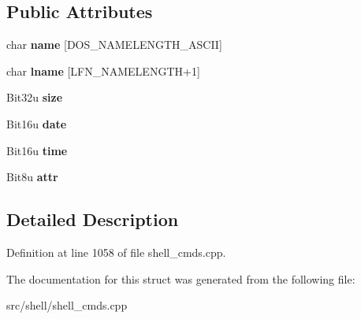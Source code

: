 \subsection*{Public Attributes}
\begin{DoxyCompactItemize}
\item 
\hypertarget{structDtaResult_a35acc0819ed5d484ae67b0a150702e65}{char {\bfseries name} \mbox{[}D\-O\-S\-\_\-\-N\-A\-M\-E\-L\-E\-N\-G\-T\-H\-\_\-\-A\-S\-C\-I\-I\mbox{]}}\label{structDtaResult_a35acc0819ed5d484ae67b0a150702e65}

\item 
\hypertarget{structDtaResult_a14bec00dd51574d0ce7ed702fcafe720}{char {\bfseries lname} \mbox{[}L\-F\-N\-\_\-\-N\-A\-M\-E\-L\-E\-N\-G\-T\-H+1\mbox{]}}\label{structDtaResult_a14bec00dd51574d0ce7ed702fcafe720}

\item 
\hypertarget{structDtaResult_ae204e54f6811d77f19876e6b7856ca58}{Bit32u {\bfseries size}}\label{structDtaResult_ae204e54f6811d77f19876e6b7856ca58}

\item 
\hypertarget{structDtaResult_ab6706554a1f9124eaf932dfff90dc962}{Bit16u {\bfseries date}}\label{structDtaResult_ab6706554a1f9124eaf932dfff90dc962}

\item 
\hypertarget{structDtaResult_a654e696728853f730e909750a2b35932}{Bit16u {\bfseries time}}\label{structDtaResult_a654e696728853f730e909750a2b35932}

\item 
\hypertarget{structDtaResult_a01eb3c4fe466f291e8ffd3d788ee9d6c}{Bit8u {\bfseries attr}}\label{structDtaResult_a01eb3c4fe466f291e8ffd3d788ee9d6c}

\end{DoxyCompactItemize}


\subsection{Detailed Description}


Definition at line 1058 of file shell\-\_\-cmds.\-cpp.



The documentation for this struct was generated from the following file\-:\begin{DoxyCompactItemize}
\item 
src/shell/shell\-\_\-cmds.\-cpp\end{DoxyCompactItemize}
